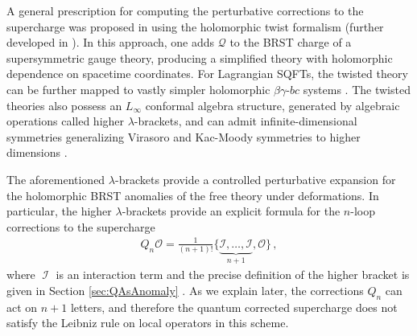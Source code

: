 \documentclass[11pt]{article}
\DeclareMathOperator{\calI}{\mathcal{I}}
\renewcommand{\bm}{\mathcal}
\begin{document}
A general prescription for computing the perturbative corrections to the supercharge was proposed in \cite{Budzik:2022mpd, Budzik:2023xbr} using the holomorphic twist formalism (further developed in \cite{Gaiotto:2024gii, Bomans:2025klo, Gui:2025dqp}). In this approach, one adds $\bm{Q}$ to the BRST charge of a supersymmetric gauge theory, producing a simplified theory with holomorphic dependence on spacetime coordinates. For Lagrangian SQFTs, the twisted theory can be further mapped to vastly simpler holomorphic $\beta\gamma$-$bc$ systems \cite{Costello:2013zra, Saberi:2019ghy, Elliott:2020ecf}. The twisted theories also possess an $L_\infty$ conformal algebra structure, generated by algebraic operations called higher $\lambda$-brackets, and can admit infinite-dimensional symmetries generalizing Virasoro and Kac-Moody symmetries to higher dimensions \cite{faonte2019higher, Gwilliam:2018lpo, Saberi:2019fkq, Bomans:2023mkd, Budzik:2023xbr, Williams:2024mcc, Scheinpflug:2024mtn, Chen:2025ujx, Bomans:2025klo}.

The aforementioned $\lambda$-brackets provide a controlled perturbative expansion for the holomorphic BRST anomalies of the free theory under deformations. In particular, the higher $\lambda$-brackets provide an explicit formula for the $n$-loop corrections to the supercharge
\begin{align}
Q_n \mathcal{O} = \frac{1}{(n+1)!} \{ \underbrace{\mathcal{I} , \dots , \mathcal{I}}_{n+1} , \mathcal{O} \} \, , \label{eq:Qnintro}
\end{align}
where $\calI$ is an interaction term and the precise definition of the higher bracket is given in Section \ref{sec:QAsAnomaly} \cite{Budzik:2022mpd, Budzik:2023xbr, Gaiotto:2024gii, Gui:2025dqp}. As we explain later, the corrections $Q_n$ can act on $n+1$ letters, and therefore the quantum corrected supercharge does not satisfy the Leibniz rule on local operators in this scheme.
  
\end{document}
